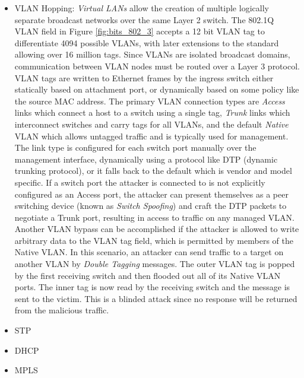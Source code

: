 \begin{itemize}
\item VLAN Hopping: \textit{Virtual LANs} allow the creation of multiple logically separate broadcast networks over the same Layer 2 switch. The 802.1Q VLAN field in Figure \ref{fig:bits_802_3} accepts a 12 bit VLAN tag to differentiate 4094 possible VLANs, with later extensions to the standard allowing over 16 million tags. Since VLANs are isolated broadcast domains, communication between VLAN nodes must be routed over a Layer 3 protocol. VLAN tags are written to Ethernet frames by the ingress switch either statically based on attachment port, or dynamically based on some policy like the source MAC address. The primary VLAN connection types are \textit{Access} links which connect a host to a switch using a single tag, \textit{Trunk} links which interconnect switches and carry tags for all VLANs, and the default \textit{Native} VLAN which allows untagged traffic and is typically used for management. The link type is configured for each switch port manually over the management interface, dynamically using a protocol like DTP (dynamic trunking protocol), or it falls back to the default which is vendor and model specific. If a switch port the attacker is connected to is not explicitly configured as an Access port, the attacker can present themselves as a peer switching device (known as \textit{Switch Spoofing}) and craft the DTP packets to negotiate a Trunk port, resulting in access to traffic on any managed VLAN. Another VLAN bypass can be accomplished if the attacker is allowed to write arbitrary data to the VLAN tag field, which is permitted by members of the Native VLAN. In this scenario, an attacker can send traffic to a target on another VLAN by \textit{Double Tagging} messages. The outer VLAN tag is popped by the first receiving switch and then flooded out all of its Native VLAN ports. The inner tag is now read by the receiving switch and the message is sent to the victim. This is a blinded attack since no response will be returned from the malicious traffic.
\item STP 
\item DHCP
\item MPLS
\end{itemize}




